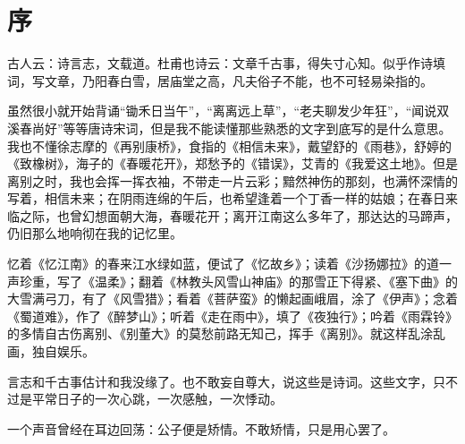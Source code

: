 \chapter{序}

古人云：诗言志，文载道。杜甫也诗云：文章千古事，得失寸心知。似乎作诗填词，写文章，乃阳春白雪，居庙堂之高，凡夫俗子不能，也不可轻易染指的。

虽然很小就开始背诵“锄禾日当午”，“离离远上草”，“老夫聊发少年狂”，“闻说双溪春尚好”等等唐诗宋词，但是我不能读懂那些熟悉的文字到底写的是什么意思。我也不懂徐志摩的《再别康桥》，食指的《相信未来》，戴望舒的《雨巷》，舒婷的《致橡树》，海子的《春暖花开》，郑愁予的《错误》，艾青的《我爱这土地》。但是离别之时，我也会挥一挥衣袖，不带走一片云彩；黯然神伤的那刻，也满怀深情的写着，相信未来；在阴雨连绵的午后，也希望逢着一个丁香一样的姑娘；在春日来临之际，也曾幻想面朝大海，春暖花开；离开江南这么多年了，那达达的马蹄声，仍旧那么地响彻在我的记忆里。

忆着《忆江南》的春来江水绿如蓝，便试了《忆故乡》；读着《沙扬娜拉》的道一声珍重，写了《温柔》；翻着《林教头风雪山神庙》的那雪正下得紧、《塞下曲》的大雪满弓刀，有了《风雪猎》；看着《菩萨蛮》的懒起画峨眉，涂了《伊声》；念着《蜀道难》，作了《醉梦山》；听着《走在雨中》，填了《夜独行》；吟着《雨霖铃》的多情自古伤离别、《别董大》的莫愁前路无知己，挥手《离别》。就这样乱涂乱画，独自娱乐。

言志和千古事估计和我没缘了。也不敢妄自尊大，说这些是诗词。这些文字，只不过是平常日子的一次心跳，一次感触，一次悸动。

一个声音曾经在耳边回荡：公子便是矫情。不敢矫情，只是用心罢了。
